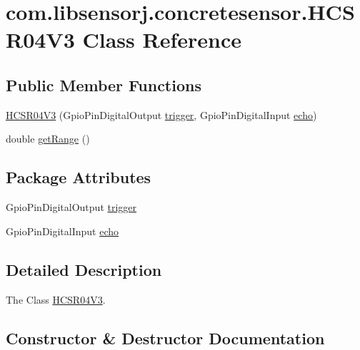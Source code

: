 \hypertarget{classcom_1_1libsensorj_1_1concretesensor_1_1HCSR04V3}{}\section{com.\+libsensorj.\+concretesensor.\+H\+C\+S\+R04\+V3 Class Reference}
\label{classcom_1_1libsensorj_1_1concretesensor_1_1HCSR04V3}
\subsection*{Public Member Functions}
\begin{DoxyCompactItemize}
\item 
\hyperlink{classcom_1_1libsensorj_1_1concretesensor_1_1HCSR04V3_aee1d36751b6c99c5f7174b251fcc8a4c}{H\+C\+S\+R04\+V3} (Gpio\+Pin\+Digital\+Output \hyperlink{classcom_1_1libsensorj_1_1concretesensor_1_1HCSR04V3_a19762eb3b140e33fde8b7e2d936a43dc}{trigger}, Gpio\+Pin\+Digital\+Input \hyperlink{classcom_1_1libsensorj_1_1concretesensor_1_1HCSR04V3_af9a0b50a27f87a546ac58b58bb31d904}{echo})
\item 
double \hyperlink{classcom_1_1libsensorj_1_1concretesensor_1_1HCSR04V3_acf38feee3623adedf5708d11e5f94158}{get\+Range} ()
\end{DoxyCompactItemize}
\subsection*{Package Attributes}
\begin{DoxyCompactItemize}
\item 
Gpio\+Pin\+Digital\+Output \hyperlink{classcom_1_1libsensorj_1_1concretesensor_1_1HCSR04V3_a19762eb3b140e33fde8b7e2d936a43dc}{trigger}
\item 
Gpio\+Pin\+Digital\+Input \hyperlink{classcom_1_1libsensorj_1_1concretesensor_1_1HCSR04V3_af9a0b50a27f87a546ac58b58bb31d904}{echo}
\end{DoxyCompactItemize}


\subsection{Detailed Description}
The Class \hyperlink{classcom_1_1libsensorj_1_1concretesensor_1_1HCSR04V3}{H\+C\+S\+R04\+V3}. 

\subsection{Constructor \& Destructor Documentation}
\hypertarget{classcom_1_1libsensorj_1_1concretesensor_1_1HCSR04V3_aee1d36751b6c99c5f7174b251fcc8a4c}{}
